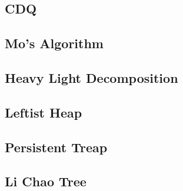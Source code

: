 \documentclass[a4paper,10pt,twocolumn,oneside]{article}
\begin{document}
\subsection{CDQ}


\subsection{Mo's Algorithm}


% 

%

\subsection{Heavy Light Decomposition}


%

% 

\subsection{Leftist Heap}


\subsection{Persistent Treap}


\subsection{Li Chao Tree}

\end{document}
